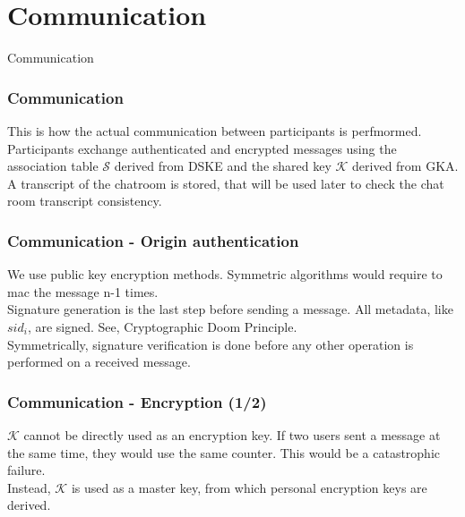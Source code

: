 \section{Communication}

\begin{frame}
\Huge{\centerline{Communication}}
\end{frame}

\begin{frame}
  \frametitle{Communication}
  This is how the actual communication between participants is perfmormed.\\[0.3cm]

  Participants exchange authenticated and encrypted messages using the association table $\mathcal{S}$ derived from DSKE and the shared key $\mathcal{K}$ derived from GKA.\\[0.3cm]
  
  A transcript of the chatroom is stored, that will be used later to check the chat room transcript consistency.

\end{frame}

\begin{frame}
  \frametitle{Communication - Origin authentication}
  We use public key encryption methods. Symmetric algorithms would require to mac the message n-1 times.\\[0.3cm]

  Signature generation is the last step before sending a message. All metadata, like $sid_i$, are signed. See, Cryptographic Doom Principle.\\[0.3cm]

  Symmetrically, signature verification is done before any other operation is performed on a received message.
\end{frame}

\begin{frame}
  \frametitle{Communication - Encryption (1/2)}
  $\mathcal{K}$ cannot be directly used as an encryption key. If two users sent a message at the same time, they would use the same counter. This would be a catastrophic failure.\\[0.3cm]
  
  Instead, $\mathcal{K}$ is used as a master key, from which personal encryption keys are derived.\\[0.3cm]
  
\end{frame}


